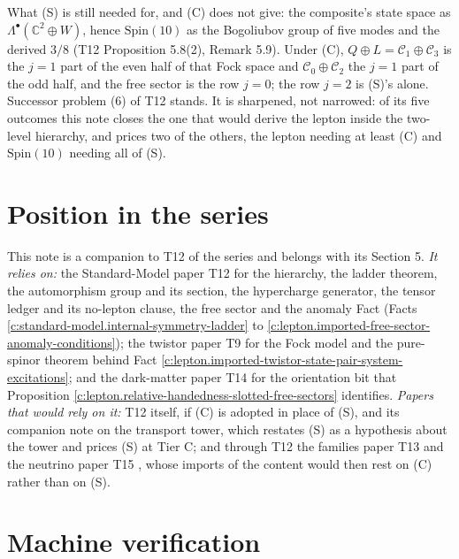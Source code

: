 \documentclass[11pt]{article}
\theoremstyle{definition}
\theoremstyle{plain}
\providecommand{\C}{}\renewcommand{\C}{\mathbb{C}}
\providecommand{\Con}{}\renewcommand{\Con}{\mathcal{C}}
\begin{document}
What (S) is still needed for, and (C) does not give: the composite's state space as $\Lambda^{\bullet}(\C^{2} \oplus W)$, hence $\mathrm{Spin}(10)$ as the Bogoliubov group of five modes and the derived $3/8$ (T12 Proposition 5.8(2), Remark 5.9). Under (C), $Q \oplus L = \Con_{1} \oplus \Con_{3}$ is the $j = 1$ part of the even half of that Fock space and $\Con_{0} \oplus \Con_{2}$ the $j = 1$ part of the odd half, and the free sector is the row $j = 0$; the row $j = 2$ is (S)'s alone. Successor problem (6) of T12 stands. It is sharpened, not narrowed: of its five outcomes this note closes the one that would derive the lepton inside the two-level hierarchy, and prices two of the others, the lepton needing at least (C) and $\mathrm{Spin}(10)$ needing all of (S).

\section{Position in the series}

\label{c:note.lepton.setting-position-series}
This note is a companion to T12 of the series and belongs with its Section 5. \emph{It relies on:} the Standard-Model paper T12 \cite{ButlerT12} for the hierarchy, the ladder theorem, the automorphism group and its section, the hypercharge generator, the tensor ledger and its no-lepton clause, the free sector and the anomaly Fact (Facts \ref{c:standard-model.internal-symmetry-ladder} to \ref{c:lepton.imported-free-sector-anomaly-conditions}); the twistor paper T9 \cite{ButlerT9} for the Fock model and the pure-spinor theorem behind Fact \ref{c:lepton.imported-twistor-state-pair-system-excitations}; and the dark-matter paper T14 \cite{ButlerT14} for the orientation bit that Proposition \ref{c:lepton.relative-handedness-slotted-free-sectors} identifies. \emph{Papers that would rely on it:} T12 itself, if (C) is adopted in place of (S), and its companion note on the transport tower, which restates (S) as a hypothesis about the tower and prices (S) at Tier C; and through T12 the families paper T13 \cite{ButlerT13} and the neutrino paper T15 \cite{ButlerT15}, whose imports of the content would then rest on (C) rather than on (S).

\section{Machine verification}
\end{document}
